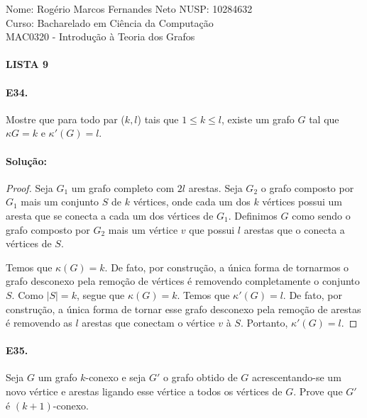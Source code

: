 \documentclass[11pt,a4paper,notitlepage]{exam}
\begin{document}
\begin{center}
    Nome: Rogério Marcos Fernandes Neto\hphantom{xxx} NUSP: 10284632\\
    Curso: Bacharelado em Ciência da Computação\\
    MAC0320 - Introdução à Teoria dos Grafos
    \paragraph{}
    \textbf{LISTA 9}
\end{center}
    \paragraph{E34.} Mostre que para todo par ($k,l$) tais que $1\leq k
    \leq l$, existe um grafo $G$ tal que $\kappa{G} = k$ e
    $\kappa'(G) = l$.
    \paragraph{Solução:}
    \begin{proof}
        Seja $G_1$ um grafo completo com $2l$ arestas. Seja $G_2$ o grafo
        composto por $G_1$ mais um conjunto $S$ de $k$ vértices, onde cada um dos $k$
        vértices possui um aresta que se conecta a cada um dos vértices
        de $G_1$. Definimos $G$ como sendo o grafo composto por $G_2$
        mais um vértice $v$ que possui $l$ arestas que o conecta
        a vértices de
        $S$.\par
        Temos que $\kappa(G) = k$. De fato, por construção, a única forma de
        tornarmos o grafo desconexo pela remoção de vértices é removendo completamente o conjunto
        $S$. Como $|S| = k$, segue que $\kappa(G)=k$.
        Temos que $\kappa'(G) = l$. De fato, por construção, a única forma de tornar
        esse grafo desconexo pela  remoção de arestas é removendo
        as $l$ arestas que conectam o vértice $v$ à $S$.
        Portanto, $\kappa'(G)=l$.
    \end{proof}  

    \paragraph{E35.} Seja $G$ um grafo $k$-conexo e seja $G'$ o grafo
    obtido de $G$ acrescentando-se um novo vértice e arestas ligando
    esse vértice a todos os vértices de $G$. Prove que $G'$ é
    $(k+1)$-conexo.
\end{document}
